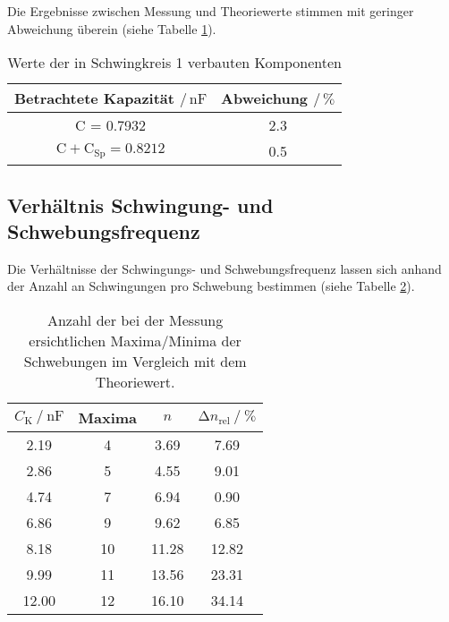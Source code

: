 Die Ergebnisse zwischen Messung und Theoriewerte stimmen mit geringer Abweichung
überein (siehe Tabelle \ref{tab:abweichung_schaltung1}).
\begin{table}
    \centering
    \caption{Werte der in Schwingkreis 1 verbauten Komponenten}
    \label{tab:abweichung_schaltung1}
    \begin{tabular}{c c}
        \toprule
        {Betrachtete Kapazität $\mathbin{/} \, \unit{\nano\farad}$} &
        {Abweichung $\mathbin{/} \, \unit{\percent}$} \\
        \midrule
        C = 0.7932                                   & 2.3  \\
        $\text{C} + \text{C}_{\text{Sp}} = 0.8212$   & 0.5  \\
        \bottomrule
    \end{tabular}
\end{table}


\subsection{Verhältnis Schwingung- und Schwebungsfrequenz}

Die Verhältnisse der Schwingungs- und Schwebungsfrequenz lassen sich anhand der
Anzahl an Schwingungen pro Schwebung bestimmen (siehe Tabelle \ref{tab:maxima}).
\begin{table} [H]
    \centering
    \caption{Anzahl der bei der Messung ersichtlichen Maxima/Minima der Schwebungen im Vergleich mit dem Theoriewert.}
    \label{tab:maxima}
    \begin{tabular}{c c c c}
        \toprule
        ${C_\text{K}} \mathbin{/} \unit{\nano\farad}$ &  Maxima &
        $n$ & $\increment n_{\text{rel}} \mathbin{/} \unit{\percent}$ \\
        \midrule
            2.19 &       4  &  3.69 &  7.69 \\
            2.86 &       5  &  4.55 &  9.01 \\
            4.74 &       7  &  6.94 &  0.90 \\
            6.86 &       9  &  9.62 &  6.85 \\
            8.18 &      10  & 11.28 & 12.82 \\
            9.99 &      11  & 13.56 & 23.31 \\
            12.00 &      12 & 16.10 & 34.14 \\
        \bottomrule
    \end{tabular}
\end{table}

